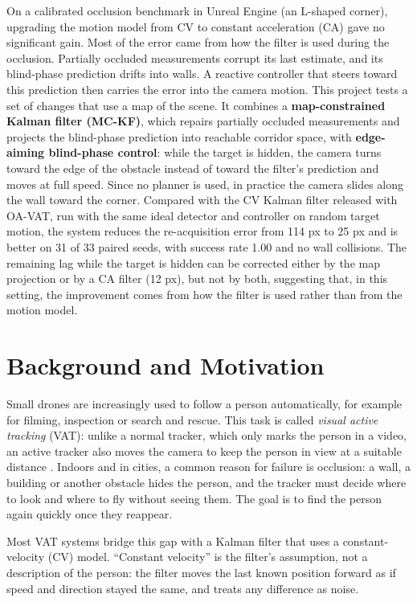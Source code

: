 \documentclass[12pt,a4paper]{article}
\begin{document}
On a calibrated occlusion benchmark in Unreal Engine (an L-shaped corner), upgrading the motion model from CV to constant acceleration (CA) gave no significant gain. Most of the error came from how the filter is used during the occlusion. Partially occluded measurements corrupt its last estimate, and its blind-phase prediction drifts into walls. A reactive controller that steers toward this prediction then carries the error into the camera motion. This project tests a set of changes that use a map of the scene. It combines a \textbf{map-constrained Kalman filter (MC-KF)}, which repairs partially occluded measurements and projects the blind-phase prediction into reachable corridor space, with \textbf{edge-aiming blind-phase control}: while the target is hidden, the camera turns toward the edge of the obstacle instead of toward the filter's prediction and moves at full speed. Since no planner is used, in practice the camera slides along the wall toward the corner. Compared with the CV Kalman filter released with OA-VAT, run with the same ideal detector and controller on random target motion, the system reduces the re-acquisition error from 114 px to 25 px and is better on 31 of 33 paired seeds, with success rate 1.00 and no wall collisions.
The remaining lag while the target is hidden can be corrected either by the map projection or by a CA filter (12 px), but not by both, suggesting that, in this setting, the improvement comes from how the filter is used rather than from the motion model.

\clearpage
\tableofcontents
\clearpage
\section{Background and Motivation}
Small drones are increasingly used to follow a person automatically, for example for filming, inspection or search and rescue.
This task is called \emph{visual active tracking} (VAT): unlike a normal tracker, which only marks the person in a video, an active tracker also moves the camera to keep the person in view at a suitable distance \cite{r1,r2}.
Indoors and in cities, a common reason for failure is occlusion: a wall, a building or another obstacle hides the person, and the tracker must decide where to look and where to fly without seeing them.
The goal is to find the person again quickly once they reappear.

Most VAT systems bridge this gap with a Kalman filter that uses a constant-velocity (CV) model.
``Constant velocity'' is the filter's assumption, not a description of the person: the filter moves the last known position forward as if speed and direction stayed the same, and treats any difference as noise.
\end{document}
